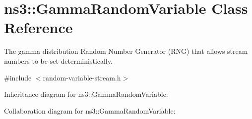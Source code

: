 \hypertarget{classns3_1_1GammaRandomVariable}{}\section{ns3\+:\+:Gamma\+Random\+Variable Class Reference}
\label{classns3_1_1GammaRandomVariable}


The gamma distribution Random Number Generator (R\+NG) that allows stream numbers to be set deterministically.  




{\ttfamily \#include $<$random-\/variable-\/stream.\+h$>$}



Inheritance diagram for ns3\+:\+:Gamma\+Random\+Variable\+:


Collaboration diagram for ns3\+:\+:Gamma\+Random\+Variable\+:
